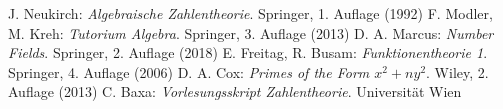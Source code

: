 \documentclass[10pt,a4paper]{article}
\theoremstyle{plain}
\theoremstyle{definition}
\theoremstyle{remark}
\begin{document}
\begin{thebibliography}{99}
 J. Neukirch: \textit{Algebraische Zahlentheorie}. Springer, 1. Auflage (1992)
 F. Modler, M. Kreh: \textit{Tutorium Algebra}. Springer, 3. Auflage (2013)
 D. A. Marcus: \textit{Number Fields}. Springer, 2. Auflage (2018)
 E. Freitag, R. Busam: \textit{Funktionentheorie 1}. Springer, 4. Auflage (2006)
 D. A. Cox: \textit{Primes of the Form ${x}^2 + n{y}^2$}. Wiley, 2. Auflage (2013)
 C. Baxa: \textit{Vorlesungsskript Zahlentheorie}. Universität Wien
\end{thebibliography}
\end{document}
